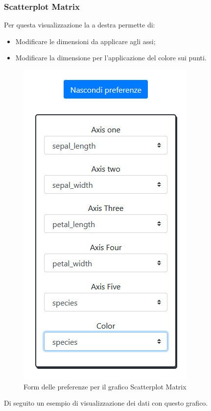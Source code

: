 \newpage

\subsubsection{Scatterplot Matrix}

Per questa visualizzazione la  a destra permette di:
\begin{itemize}
	\item Modificare le dimensioni da applicare agli assi;
	\item Modificare la dimensione per l'applicazione del colore sui punti.
\end{itemize} 

\begin{figure}[H]
		\includegraphics[scale=0.7]{Images/Form.png}
		\centering
		\caption{Form delle preferenze per il grafico Scatterplot Matrix}
\end{figure}

\newpage
Di seguito un esempio di visualizzazione dei dati con questo grafico.

